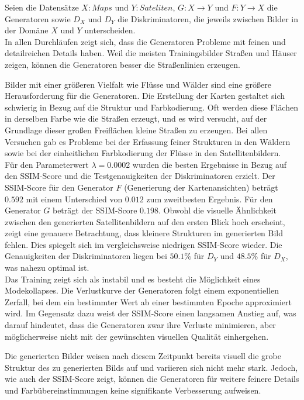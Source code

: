 Seien die Datensätze $X: Maps$ und $Y: Sateliten$, $G: X\rightarrow Y$ und $F: Y\rightarrow X$ die Generatoren sowie $D_X$ und $D_Y$ die Diskriminatoren, die jeweils zwischen Bilder in der Domäne $X$ und $Y$ unterscheiden. 
\\\newline
In allen Durchläufen zeigt sich, dass die Generatoren Probleme mit feinen und detailreichen Details haben. Weil die meisten Trainingsbilder Straßen und Häuser zeigen, können die Generatoren besser die Straßenlinien erzeugen.

Bilder mit einer größeren Vielfalt wie Flüsse und Wälder sind eine größere Herausforderung für die Generatoren. Die Erstellung der Karten gestaltet sich schwierig in Bezug auf die Struktur und Farbkodierung. Oft werden diese Flächen in derselben Farbe wie die Straßen erzeugt, und es wird versucht, auf der Grundlage dieser großen Freiflächen kleine Straßen zu erzeugen. Bei allen Versuchen gab es Probleme bei der Erfassung feiner Strukturen in den Wäldern sowie bei der einheitlichen Farbkodierung der Flüsse in den Satellitenbildern. 
\\\newline
Für den Parameterwert $\lambda=0.0002$ wurden die besten Ergebnisse in Bezug auf den SSIM-Score und die Testgenauigkeiten der Diskriminatoren erzielt. Der SSIM-Score für den Generator $F$ (Generierung der Kartenansichten) beträgt $0.592$ mit einem Unterschied von $0.012$ zum zweitbesten Ergebnis. Für den Generator $G$ beträgt der SSIM-Score $0.198$. Obwohl die visuelle Ähnlichkeit zwischen den generierten Satellitenbildern auf den ersten Blick hoch erscheint, zeigt eine genauere Betrachtung, dass kleinere Strukturen im generierten Bild fehlen. Dies spiegelt sich im vergleichsweise niedrigen SSIM-Score wieder. Die Genauigkeiten der Diskriminatoren liegen bei $50.1\%$ für $D_Y$ und $48.5\%$ für $D_X$, was nahezu optimal ist.
\\\newline
Das Training zeigt sich als instabil und es besteht die Möglichkeit eines Modekollapses. Die Verlustkurve der Generatoren folgt einem exponentiellen Zerfall, bei dem ein bestimmter Wert ab einer bestimmten Epoche approximiert wird. Im Gegensatz dazu weist der SSIM-Score einen langsamen Anstieg auf, was darauf hindeutet, dass die Generatoren zwar ihre Verluste minimieren, aber möglicherweise nicht mit der gewünschten visuellen Qualität einhergehen.

Die generierten Bilder weisen nach diesem Zeitpunkt bereits visuell die grobe Struktur des zu generierten Bilds auf und variieren sich nicht mehr stark. Jedoch, wie auch der SSIM-Score zeigt, können die Generatoren für weitere feinere Details und Farbübereinstimmungen keine signifikante Verbesserung aufweisen.

